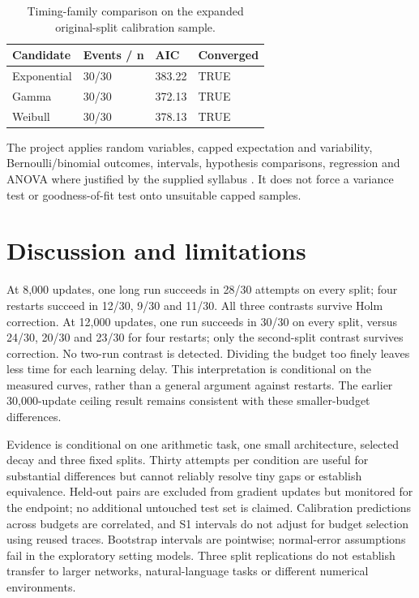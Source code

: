 \documentclass[conference,letterpaper]{IEEEtran}
\begin{document}
\begin{table}[!t]

\caption{Timing-family comparison on the expanded original-split calibration sample.}

\centering\footnotesize

\begin{tabularx}{\columnwidth}{XXXX}

\toprule

Candidate & Events / n & AIC & Converged\\

\midrule

Exponential & 30/30 & 383.22 & TRUE\\

Gamma & 30/30 & 372.13 & TRUE\\

Weibull & 30/30 & 378.13 & TRUE\\

\bottomrule

\end{tabularx}

\end{table}

The project applies random variables, capped expectation and variability, Bernoulli/binomial outcomes, intervals, hypothesis comparisons, regression and ANOVA where justified by the supplied syllabus \cite{ref7}. It does not force a variance test or goodness-of-fit test onto unsuitable capped samples.

\section{Discussion and limitations}

At 8,000 updates, one long run succeeds in 28/30 attempts on every split; four restarts succeed in 12/30, 9/30 and 11/30. All three contrasts survive Holm correction. At 12,000 updates, one run succeeds in 30/30 on every split, versus 24/30, 20/30 and 23/30 for four restarts; only the second-split contrast survives correction. No two-run contrast is detected. Dividing the budget too finely leaves less time for each learning delay. This interpretation is conditional on the measured curves, rather than a general argument against restarts. The earlier 30,000-update ceiling result remains consistent with these smaller-budget differences.

Evidence is conditional on one arithmetic task, one small architecture, selected decay and three fixed splits. Thirty attempts per condition are useful for substantial differences but cannot reliably resolve tiny gaps or establish equivalence. Held-out pairs are excluded from gradient updates but monitored for the endpoint; no additional untouched test set is claimed. Calibration predictions across budgets are correlated, and S1 intervals do not adjust for budget selection using reused traces. Bootstrap intervals are pointwise; normal-error assumptions fail in the exploratory setting models. Three split replications do not establish transfer to larger networks, natural-language tasks or different numerical environments.
\end{document}
